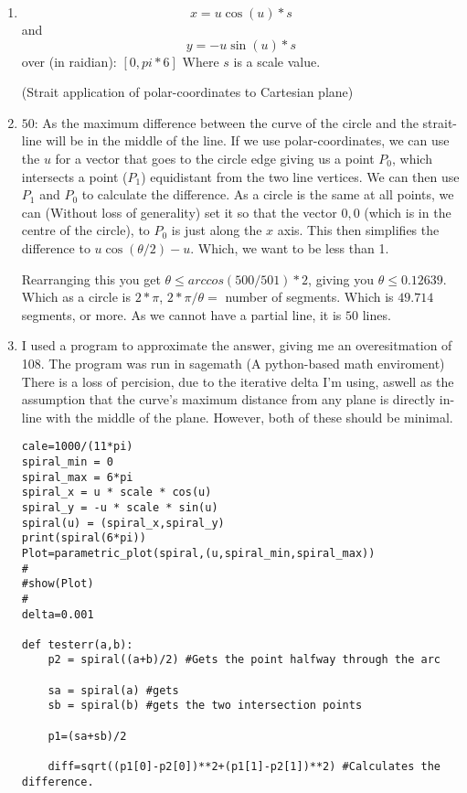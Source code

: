 
\begin{enumerate}

\item  
$$x = u \cos(u) *s$$
and
$$y = -u \sin(u) *s$$
over (in raidian): $[0,pi*6]$
Where $s$ is a scale value.


(Strait application of polar-coordinates to Cartesian plane)

\item $50$: As the maximum difference between the curve of the circle and the strait-line will be in the middle of the line. If we use polar-coordinates, we can use the $u$ for a vector that goes to the circle edge giving us a point $P_0$, which intersects a point ($P_1$) equidistant from the two line vertices. We can then use $P_1$ and $P_0$ to calculate the difference.
As a circle is the same at all points, we can (Without loss of generality) set it so that the vector $0,0$ (which is in the centre of the circle), to $P_0$ is just along the $x$ axis. This then simplifies the difference to $u\cos(\theta/2)-u$. Which, we want to be less than 1.

Rearranging this you get $\theta \leq arccos(500/501)*2$, giving you $\theta \leq  0.12639$. Which as a circle is $2*\pi$, $2*\pi/\theta =$ number of segments. Which is $49.714$ segments, or more. As we cannot have a partial line, it is $50$ lines.


\item 
I used a program to approximate the answer, giving me an overesitmation of 108.
The program was run in sagemath (A python-based math enviroment)
There is a loss of percision, due to the iterative delta I'm using, aswell as the assumption that the curve's maximum distance from any plane is directly in-line with the middle of the plane. However, both of these should be minimal.
\begin{verbatim}
cale=1000/(11*pi)
spiral_min = 0
spiral_max = 6*pi
spiral_x = u * scale * cos(u)
spiral_y = -u * scale * sin(u)
spiral(u) = (spiral_x,spiral_y)
print(spiral(6*pi))
Plot=parametric_plot(spiral,(u,spiral_min,spiral_max))
#
#show(Plot)
#
delta=0.001

def testerr(a,b):
    p2 = spiral((a+b)/2) #Gets the point halfway through the arc
    
    sa = spiral(a) #gets
    sb = spiral(b) #gets the two intersection points
    
    p1=(sa+sb)/2
        
    diff=sqrt((p1[0]-p2[0])**2+(p1[1]-p2[1])**2) #Calculates the difference.
    

\end{verbatim}
\end{enumerate}
